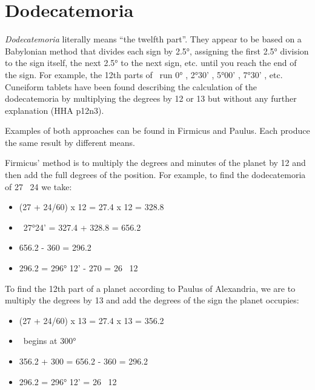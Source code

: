 \chapter{Dodecatemoria}
\label{appendix:dodecatemoria}

\textsl{Dodecatemoria} literally means ``the twelfth part''. They appear to be based on a Babylonian method that divides each sign by  2.5°, assigning the first 2.5° division to the sign itself, the next 2.5° to the next sign, etc. until you reach the end of the sign. For example, the 12th parts of \Libra\, run 0° \Libra, 2°30' \Scorpio, 5°00' \Sagittarius, 7°30' \Capricorn, etc.  Cuneiform tablets have been found describing the calculation of the dodecatemoria by multiplying the degrees by 12 or 13 but without any further explanation (HHA p12n3). 

Examples of both approaches can be found in Firmicus and Paulus. Each produce the same result by different means\footnotemark[1].


Firmicus' method is to multiply the degrees and minutes of the planet  by 12 and then add the full degrees of the position. For example, to find the dodecatemoria of 27 \Aquarius\, 24 we take:
\begin{itemize}
\item[] (27 + 24/60) x 12 = 27.4 x 12 = 328.8
\item[] \Aquarius\, 27°24' = 327.4 + 328.8 = 656.2
\item[] 656.2 - 360 = 296.2
\item[] 296.2 = 296° 12' - 270 = 26 \Capricorn\, 12
\end{itemize}

To find the 12th part of a planet according to Paulus of Alexandria, we  are to  multiply the degrees by 13 and add the degrees of the sign the planet occupies:
\begin{itemize}
\item[] (27 + 24/60) x 13 = 27.4 x 13 = 356.2
\item[] \Aquarius\, begins at 300°
\item[] 356.2 + 300 = 656.2 - 360 = 296.2
\item[] 296.2 = 296° 12' = 26 \Capricorn\, 12
\end{itemize}

